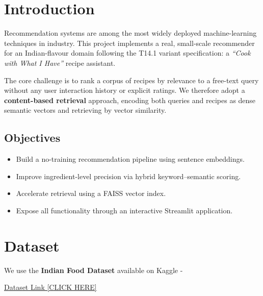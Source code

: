 \documentclass[12pt,a4paper]{article}
\begin{document}
\tableofcontents
\newpage

\section{Introduction}

Recommendation systems are among the most widely deployed machine-learning
techniques in industry. This project implements a real, small-scale recommender
for an Indian-flavour domain following the T14.1 variant specification: a
\emph{``Cook with What I Have''} recipe assistant.

The core challenge is to rank a corpus of recipes by relevance to a free-text
query without any user interaction history or explicit ratings. We therefore
adopt a \textbf{content-based retrieval} approach, encoding both queries and
recipes as dense semantic vectors and retrieving by vector similarity.

\subsection{Objectives}
\begin{itemize}[leftmargin=2em]
  \item Build a no-training recommendation pipeline using sentence embeddings.
  \item Improve ingredient-level precision via hybrid keyword--semantic scoring.
  \item Accelerate retrieval using a FAISS vector index.
  \item Expose all functionality through an interactive Streamlit application.
\end{itemize}

\section{Dataset}

We use the \textbf{Indian Food Dataset} available on
Kaggle - {\normalsize\href{https://github.com/kanishk307/IndianFoodDatasetGeneration}{Dataset Link [CLICK HERE]}\par} \\[5em]
\end{document}
